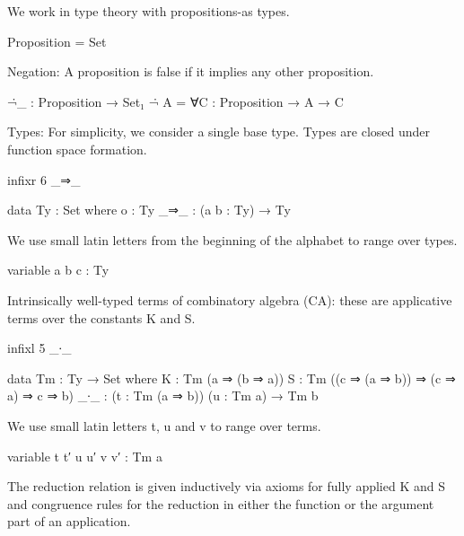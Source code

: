 


We work in type theory with propositions-as types.

\begin{code}
Proposition = Set
\end{code}

Negation: A proposition is false if it implies any other proposition.

\begin{code}
¬̇_ : Proposition → Set₁
¬̇ A = ∀{C : Proposition} → A → C
\end{code}


Types:
For simplicity, we consider a single base type.
Types are closed under function space formation.

\begin{code}
infixr 6 _⇒_

data Ty : Set where
  o    : Ty
  _⇒_  : (a b : Ty) → Ty
\end{code}

We use small latin letters from the beginning of the alphabet to range over types.

\begin{code}
variable a b c : Ty
\end{code}

Intrinsically well-typed terms of combinatory algebra (CA):
these are applicative terms over the constants K and S.

\begin{code}
infixl 5 _∙_

data Tm : Ty → Set where
  K    : Tm (a ⇒ (b ⇒ a))
  S    : Tm ((c ⇒ (a ⇒ b)) ⇒ (c ⇒ a) ⇒ c ⇒ b)
  _∙_  : (t : Tm (a ⇒ b)) (u : Tm a) → Tm b
\end{code}

We use small latin letters t, u and v to range over terms.

\begin{code}
variable t t′ u u′ v v′ : Tm a
\end{code}

The reduction relation is given inductively
via axioms for fully applied K and S
and congruence rules for the reduction
in either the function or the argument part
of an application.

